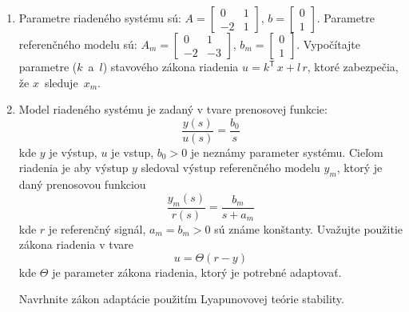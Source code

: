 \documentclass[a4paper, 10pt, ]{article}
\begin{document}
\begin{enumerate}[leftmargin=0pt, labelsep=4mm, itemsep=0pt]


    \item Parametre riadeného systému sú: $\displaystyle A = \begin{bmatrix} 0 & 1 \\ -2 & 1 \end{bmatrix}$, $\displaystyle b = \begin{bmatrix} 0  \\  1 \end{bmatrix}$. Parametre referenčného modelu sú: $\displaystyle A_m = \begin{bmatrix} 0 & 1 \\ -2 & -3 \end{bmatrix}$, $\displaystyle b_m = \begin{bmatrix} 0  \\  1 \end{bmatrix}$. Vypočítajte parametre ($k$~a~$l$) stavového zákona riadenia $u = k^\mathsf{T}\, x + l\,r$, ktoré zabezpečia, že $x$~sleduje~$x_m$.


    \bigskip




    \item Model riadeného systému je zadaný v tvare prenosovej funkcie:
    		\begin{equation*}
    			\frac{y(s)}{u(s)} = \frac{b_0}{s}
    		\end{equation*}
    	kde $y$ je výstup, $u$ je vstup, $b_0 > 0$ je neznámy parameter systému. Cieľom riadenia je aby výstup $y$ sledoval výstup referenčného modelu $y_m$, ktorý je daný prenosovou funkciou
    	\begin{equation*}
    			\frac{y_m(s)}{r(s)} = \frac{b_m}{s + a_m}
    		\end{equation*}
    		kde $r$ je referenčný signál, $a_m = b_m > 0$ sú známe konštanty. Uvažujte použitie zákona riadenia v tvare
    		\begin{equation*}
    			u = \Theta (r - y)
    		\end{equation*}
    		kde $\Theta$ je parameter zákona riadenia, ktorý je potrebné adaptovať.

    		Navrhnite zákon adaptácie použitím Lyapunovovej teórie stability.







\end{enumerate}
\end{document}
